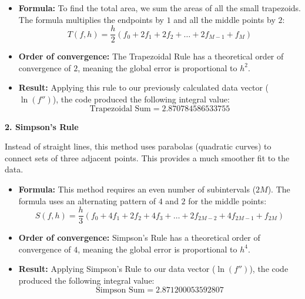 \documentclass{article}
\begin{document}
\begin{itemize}   
    \item \textbf{Formula:} To find the total area, we sum the areas of all the small trapezoids. The formula multiplies the endpoints by $1$ and all the middle points by $2$:
    \begin{equation}
        T(f, h) = \frac{h}{2}(f_0 + 2f_1 + 2f_2 + \dots + 2f_{M-1} + f_M)
    \end{equation}
    
    \item \textbf{Order of convergence:} The Trapezoidal Rule has a theoretical order of convergence of $2$, meaning the global error is proportional to $h^2$.
    
    \item \textbf{Result:} Applying this rule to our previously calculated data vector ($\ln(f'')$), the code produced the following integral value:
    \begin{equation*}
        \text{Trapezoidal Sum} = 2.870784586533755
    \end{equation*}
\end{itemize}

\vspace{5pt}
\noindent \textbf{2. Simpson's Rule} \cite[page 257]{Sauer2014}

Instead of straight lines, this method uses parabolas (quadratic curves) to connect sets of three adjacent points. This provides a much smoother fit to the data.

\begin{itemize}    
    \item \textbf{Formula:} This method requires an even number of subintervals ($2M$). The formula uses an alternating pattern of $4$ and $2$ for the middle points:
    \begin{equation}
        S(f, h) = \frac{h}{3}(f_0 + 4f_1 + 2f_2 + 4f_3 + \dots + 2f_{2M-2} + 4f_{2M-1} + f_{2M})
    \end{equation}
    
    \item \textbf{Order of convergence:} Simpson's Rule has a theoretical order of convergence of $4$, meaning the global error is proportional to $h^4$.
    
    \item \textbf{Result:} Applying Simpson's Rule to our data vector ($\ln(f'')$), the code produced the following integral value:
    \begin{equation*}
        \text{Simpson Sum} = 2.871200053592807
    \end{equation*}
\end{itemize}
\end{document}
